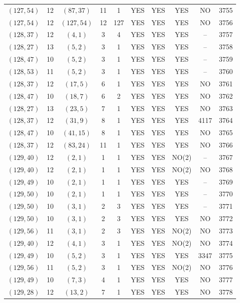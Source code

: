 \begin{longtable}{|c|c|c|c|c|c|c|c|c|c|}
$(127, 54)$ & 12 & $(87, 37)$ & 11 & 1 & YES & YES & YES & NO & 3755\\
$(127, 54)$ & 12 & $(127, 54)$ & 12 & 127 & YES & YES & YES & NO & 3756\\
$(128, 37)$ & 12 & $(4, 1)$ & 3 & 4 & YES & YES & YES & -- & 3757\\
$(128, 27)$ & 13 & $(5, 2)$ & 3 & 1 & YES & YES & YES & -- & 3758\\
$(128, 47)$ & 10 & $(5, 2)$ & 3 & 1 & YES & YES & YES & -- & 3759\\
$(128, 53)$ & 11 & $(5, 2)$ & 3 & 1 & YES & YES & YES & -- & 3760\\
$(128, 37)$ & 12 & $(17, 5)$ & 6 & 1 & YES & YES & YES & NO & 3761\\
$(128, 47)$ & 10 & $(18, 7)$ & 6 & 2 & YES & YES & YES & NO & 3762\\
$(128, 27)$ & 13 & $(23, 5)$ & 7 & 1 & YES & YES & YES & NO & 3763\\
$(128, 37)$ & 12 & $(31, 9)$ & 8 & 1 & YES & YES & YES & 4117 & 3764\\
$(128, 47)$ & 10 & $(41, 15)$ & 8 & 1 & YES & YES & YES & NO & 3765\\
$(128, 37)$ & 12 & $(83, 24)$ & 11 & 1 & YES & YES & YES & NO & 3766\\
$(129, 40)$ & 12 & $(2, 1)$ & 1 & 1 & YES & YES & NO(2) & -- & 3767\\
$(129, 40)$ & 12 & $(2, 1)$ & 1 & 1 & YES & YES & NO(2) & NO & 3768\\
$(129, 49)$ & 10 & $(2, 1)$ & 1 & 1 & YES & YES & YES & -- & 3769\\
$(129, 50)$ & 10 & $(2, 1)$ & 1 & 1 & YES & YES & YES & -- & 3770\\
$(129, 50)$ & 10 & $(3, 1)$ & 2 & 3 & YES & YES & YES & -- & 3771\\
$(129, 50)$ & 10 & $(3, 1)$ & 2 & 3 & YES & YES & YES & NO & 3772\\
$(129, 56)$ & 11 & $(3, 1)$ & 2 & 3 & YES & YES & NO(2) & NO & 3773\\
$(129, 40)$ & 12 & $(4, 1)$ & 3 & 1 & YES & YES & NO(2) & NO & 3774\\
$(129, 49)$ & 10 & $(5, 2)$ & 3 & 1 & YES & YES & YES & 3347 & 3775\\
$(129, 56)$ & 11 & $(5, 2)$ & 3 & 1 & YES & YES & NO(2) & NO & 3776\\
$(129, 49)$ & 10 & $(7, 3)$ & 4 & 1 & YES & YES & YES & NO & 3777\\
$(129, 28)$ & 12 & $(13, 2)$ & 7 & 1 & YES & YES & YES & NO & 3778\\

\end{longtable}
